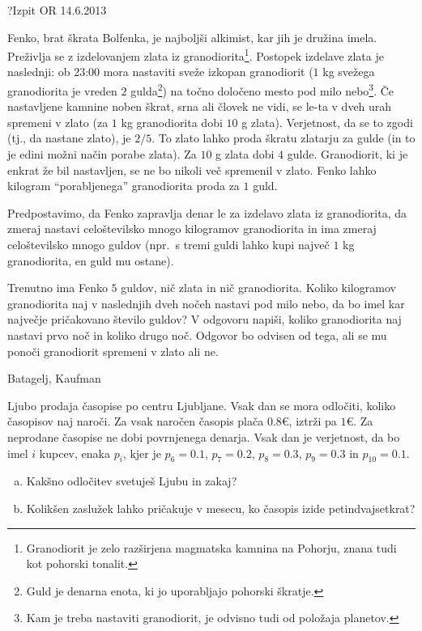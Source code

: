 \begin{naloga}{?}{Izpit OR 14.6.2013}
\begin{vprasanje}[fenko]
Fenko, brat škrata Bolfenka, je najboljši alkimist, kar jih je družina imela.
Preživlja se z izdelovanjem zlata iz granodiorita\footnote{
Granodiorit je zelo razširjena magmatska kamnina na Pohorju,
znana tudi kot pohorski tonalit.
}.
Postopek izdelave zlata je naslednji:
ob 23:00 mora nastaviti sveže izkopan granodiorit
($1$ kg svežega granodiorita je vreden $2$ gulda\footnote{
Guld je denarna enota, ki jo uporabljajo pohorski škratje.
})
na točno določeno mesto pod milo nebo\footnote{
Kam je treba nastaviti granodiorit, je odvisno tudi od položaja planetov.
}.
Če nastavljene kamnine noben škrat, srna ali človek ne vidi,
se le-ta v dveh urah spremeni v zlato
(za $1$ kg granodiorita dobi $10$ g zlata).
Verjetnost, da se to zgodi (tj., da nastane zlato), je $2/5$.
To zlato lahko proda škratu zlatarju za gulde
(in to je edini možni način porabe zlata).
Za $10$ g zlata dobi $4$ gulde.
Granodiorit, ki je enkrat že bil nastavljen,
se ne bo nikoli več spremenil v zlato.
Fenko lahko kilogram ``porabljenega'' granodiorita proda za $1$ guld.

Predpostavimo, da Fenko zapravlja denar le za izdelavo zlata iz granodiorita,
da zmeraj nastavi celoštevilsko mnogo kilogramov granodiorita
in ima zmeraj celoštevilsko mnogo guldov
(npr.~s tremi guldi lahko kupi največ $1$ kg granodiorita, en guld mu ostane).

Trenutno ima Fenko $5$ guldov, nič zlata in nič granodiorita.
Koliko kilogramov granodiorita
naj v naslednjih dveh nočeh nastavi pod milo nebo,
da bo imel kar največje pričakovano število guldov?
V odgovoru napiši,
koliko granodiorita naj nastavi prvo noč in koliko drugo noč.
Odgovor bo odvisen od tega,
ali se mu ponoči granodiorit spremeni v zlato ali ne.
\end{vprasanje}
\begin{odgovor}
\end{odgovor}
\end{naloga}


\begin{naloga}{Batagelj, Kaufman}{\cite[Naloga~4.3]{bk}}
\begin{vprasanje}[ljubo]
Ljubo prodaja časopise po centru Ljubljane.
Vsak dan se mora odločiti, koliko časopisov naj naroči.
Za vsak naročen časopis plača $0.8 €$, iztrži pa $1 €$.
Za neprodane časopise ne dobi povrnjenega denarja.
Vsak dan je verjetnost, da bo imel $i$ kupcev, enaka $p_i$,
kjer je $p_6 = 0.1$, $p_7 = 0.2$, $p_8 = 0.3$, $p_9 = 0.3$ in $p_{10} = 0.1$.
\begin{enumerate}[(a)]
\item Kakšno odločitev svetuješ Ljubu in zakaj?
\item Kolikšen zaslužek lahko pričakuje v mesecu,
ko časopis izide petindvajsetkrat?
\end{enumerate}
\end{vprasanje}
\begin{odgovor}
\end{odgovor}
\end{naloga}


